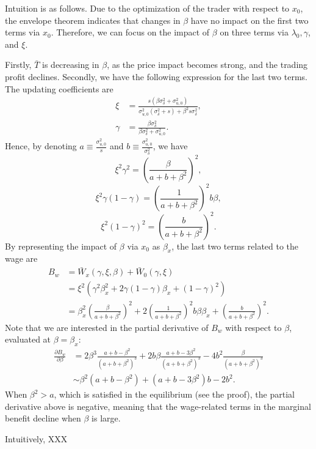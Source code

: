 Intuition is as follows. Due to the optimization of the trader with respect to $x_{0}$, the envelope theorem indicates that changes in $\beta$ have no impact on the first two terms via $x_{0}$. Therefore, we can focus on the impact of $\beta$ on three terms via  $\lambda_{0}, \gamma$, and $\xi$. 

Firstly, $\bar{T}$ is decreasing in $\beta$, as the price impact becomes strong, and the trading profit declines. 
Secondly, we have the following expression for the last two terms. The updating coefficients are
\begin{align*}
\xi & =\frac{s (\beta\sigma_{\delta}^{2}+\sigma_{u,0}^{2})}{\sigma_{u,0}^{2}(\sigma_{\delta}^{2}+s)+\beta^{2}s\sigma_{\delta}^{2}},\\
\gamma & =\frac{\beta\sigma_{\delta}^{2}}{\beta\sigma_{\delta}^{2}+\sigma_{u,0}^{2}}.
\end{align*}
Hence, by denoting $a \equiv \frac{\sigma_{u,0}^{2}}{s}$  and $b \equiv \frac{\sigma_{u,0}^{2}}{\sigma_{\delta}^{2}}$, we have
\[
\xi^{2}\gamma^{2}=\left(\frac{\beta}{a+b+\beta^{2}}\right)^{2},
\]
\[
\xi^{2}\gamma(1-\gamma)=\left(\frac{1}{a+b+\beta^{2}}\right)^{2}b\beta,
\]
\[
\xi^{2}(1-\gamma)^{2}=\left(\frac{b}{a+b+\beta^{2}}\right)^{2}.
\]
By representing the impact of  $\beta$ via $x_{0}$ as $\beta_{x}$, the last two terms related to the wage are   
\begin{align}
    B_{w} &= \bar{W}_{x}(\gamma,\xi,\beta) + \bar{W}_{0}(\gamma,\xi)\\
 & = \xi^{2}\left(\gamma^{2}\beta_{x}^{2} + 2\gamma(1-\gamma) \beta_{x}+  (1-\gamma)^2 \right)\\
 & = \beta_{x}^2 \left(\frac{\beta}{a+b+\beta^{2}}\right)^{2} + 2\left(\frac{1}{a+b+\beta^{2}}\right)^{2}b\beta\beta_{x} + \left(\frac{b}{a+b+\beta^{2}}\right)^{2}.
\end{align}
Note that we are interested in the partial derivative of $B_{w}$ with respect to $\beta$, evaluated at $\beta = \beta_{x}$:
\begin{align*}
\frac{\partial B_{w}}{\partial \beta} & = 2\beta^{3}\frac{a+b-\beta^{2}}{(a+b+\beta^{2})^{3}} + 2b\beta\frac{a+b-3\beta^{2}}{(a+b+\beta^{2})^{3}} - 4b^{2}\frac{\beta}{(a+b+\beta^{2})^{3}}\\
& \sim \beta^{2}(a+b-\beta^{2}) + (a+b-3\beta^{2})b - 2b^{2}.
\end{align*}
 When $\beta^{2} > a$, which is satisfied in the equilibrium (see the proof), the partial derivative above is negative, meaning that the wage-related terms in the marginal benefit decline when $\beta$ is large.

 Intuitively, XXX


